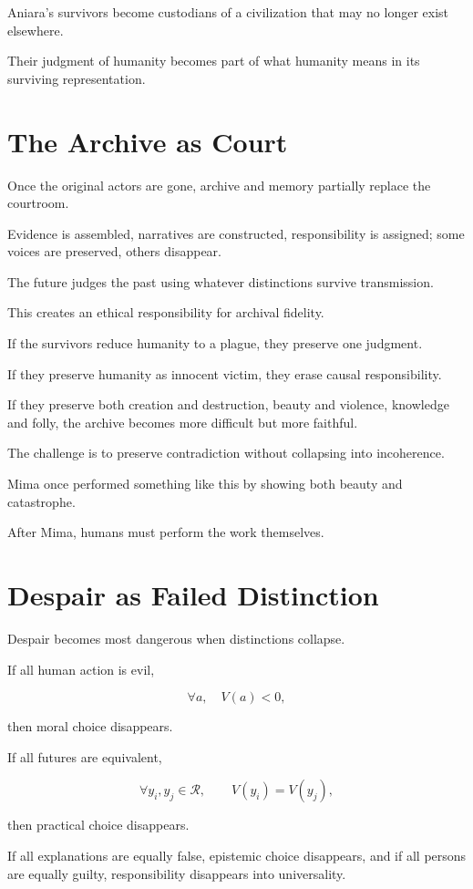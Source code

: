 \documentclass[11pt,oneside]{book}
\theoremstyle{definition}
\theoremstyle{remark}
\newcommand{\R}{\mathcal{R}}
\begin{document}
Aniara's survivors become custodians of a civilization that may no longer exist elsewhere.

Their judgment of humanity becomes part of what humanity means in its surviving representation.

\section{The Archive as Court}

Once the original actors are gone, archive and memory partially replace the courtroom.

Evidence is assembled, narratives are constructed, responsibility is assigned; some voices are preserved, others disappear.

The future judges the past using whatever distinctions survive transmission.

This creates an ethical responsibility for archival fidelity.

If the survivors reduce humanity to a plague, they preserve one judgment.

If they preserve humanity as innocent victim, they erase causal responsibility.

If they preserve both creation and destruction, beauty and violence, knowledge and folly, the archive becomes more difficult but more faithful.

The challenge is to preserve contradiction without collapsing into incoherence.

Mima once performed something like this by showing both beauty and catastrophe.

After Mima, humans must perform the work themselves.

\section{Despair as Failed Distinction}

Despair becomes most dangerous when distinctions collapse.

If all human action is evil,

\[
\forall a,\quad V(a)<0,
\]

then moral choice disappears.

If all futures are equivalent,

\[
\forall y_i,y_j\in\R,
\qquad
V(y_i)=V(y_j),
\]

then practical choice disappears.

If all explanations are equally false, epistemic choice disappears, and if all persons are equally guilty, responsibility disappears into universality.
\end{document}
